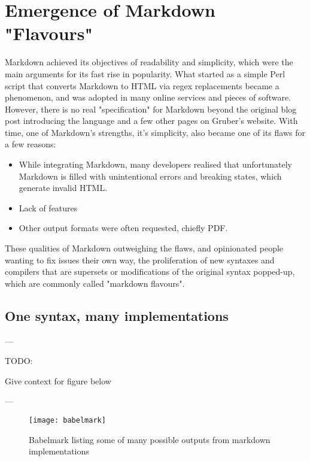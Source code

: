 \chapter{Emergence of Markdown "Flavours"}

\vspace{1cm}

Markdown achieved its objectives of readability and simplicity, which were the main arguments for its fast rise in popularity. What started as a simple Perl script that converts Markdown to HTML via regex replacements became a phenomenon, and was adopted in many online services and pieces of software.\\

However, there is no real "specification" for Markdown beyond the original blog post introducing the language and a few other pages on Gruber's website. With time, one of Markdown's strengths, it's simplicity, also became one of its flaws for a few reasons:

\begin{itemize}
    \item While integrating Markdown, many developers realised that unfortunately Markdown is filled with unintentional errors and breaking states, which generate invalid HTML.
    \item Lack of features
    \item Other output formats were often requested, chiefly PDF.
\end{itemize}

These qualities of Markdown outweighing the flaws, and opinionated people wanting to fix issues their own way, the proliferation of new syntaxes and compilers that are supersets or modifications of the original syntax popped-up, which are commonly called "markdown flavours".


\section{One syntax, many implementations}

---

TODO:

Give context for figure below

---

\begin{figure}[h]
\centering
\texttt{[image: babelmark]}
\caption{Babelmark listing some of many possible outputs from markdown implementations}
\end{figure}

